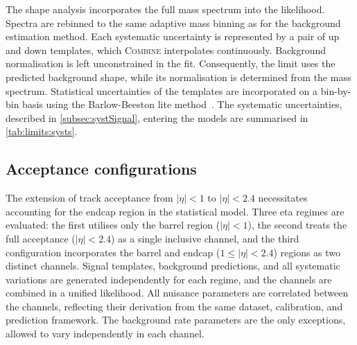 \vspace{0.5 cm}

The shape analysis incorporates the full mass spectrum into the likelihood. Spectra are rebinned to the same adaptive mass binning as for the background estimation method. Each systematic uncertainty is represented by a pair of up and down templates, which \textsc{Combine} interpolates continuously. Background normalisation is left unconstrained in the fit. Consequently, the limit uses the predicted background shape, while its normalisation is determined from the mass spectrum. Statistical uncertainties of the templates are incorporated on a bin-by-bin basis using the Barlow-Beeston lite method~\cite{Cranmer:1456844}. The systematic uncertainties, described in \cref{subsec:systSignal}, entering the models are summarised in \cref{tab:limits:systs}.

\subsection{Acceptance configurations}
\label{sec:limits:categories}

The extension of track acceptance from $|\eta|<1$ to $|\eta|<2.4$ necessitates accounting for the endcap region in the statistical model. Three eta regimes are evaluated: the first utilises only the barrel region ($|\eta|<1$), the second treats the full acceptance ($|\eta|<2.4$) as a single inclusive channel, and the third configuration incorporates the barrel and endcap ($1\leq|\eta|<2.4$) regions as two distinct channels. Signal templates, background predictions, and all systematic variations are generated independently for each regime, and the channels are combined in a unified likelihood. All nuisance parameters are correlated between the channels, reflecting their derivation from the same dataset, calibration, and prediction framework. The background rate parameters are the only exceptions, allowed to vary independently in each channel.

\clearpage

